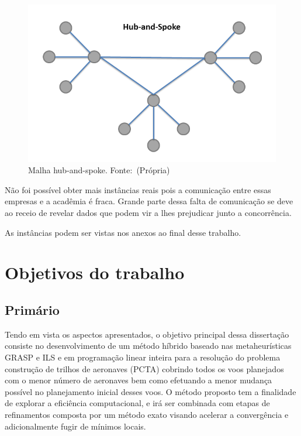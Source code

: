 \begin{figure}[ht]
\caption{Malha hub-and-spoke. \newline \mbox{Fonte: (Própria)}}
\label{fig:hubandspoke}
\includegraphics[scale=0.35]{./img/hubandspoke}
\end{figure}
 	 	
	
Não foi possível obter mais instâncias reais pois a comunicação entre essas
empresas e a acadêmia é fraca. Grande parte dessa falta de comunicação se deve
ao receio de revelar dados que podem vir a lhes prejudicar junto a concorrência.

As instâncias podem ser vistas nos anexos ao final desse trabalho.


\section {Objetivos do trabalho}


\subsection{Primário}
Tendo em vista os aspectos apresentados, o objetivo principal dessa dissertação
consiste no desenvolvimento de um método híbrido baseado nas metaheurísticas
GRASP e ILS e em programação linear inteira para a resolução do problema
construção de trilhos de aeronaves (PCTA) cobrindo todos os voos planejados com
o menor número de aeronaves bem como efetuando a menor mudança possível no
planejamento inicial desses voos. O método proposto tem a finalidade de
explorar a eficiência computacional, e irá ser combinada com etapas de
refinamentos composta por um método exato visando acelerar a convergência e
adicionalmente fugir de mínimos locais.

